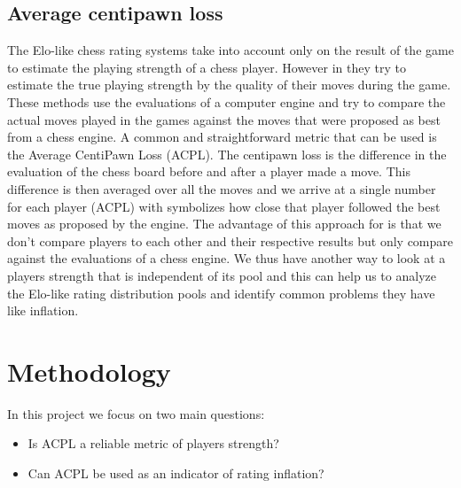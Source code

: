 \documentclass{article}
\begin{document}
\subsection{Average centipawn loss}
The Elo-like chess rating systems take into account only on the result of the game to estimate the playing strength of a chess player. However in \cite{icr,Alliot,Guid} they try to estimate the true playing strength by the quality of their moves during the game. These methods use the evaluations of a computer engine and try to compare the actual moves played in the games against the moves that were proposed as best from a chess engine. A common and straightforward metric that can be used is the Average CentiPawn Loss (ACPL). The centipawn loss is the difference in the evaluation of the chess board before and after a player made a move. This difference is then averaged over all the moves and we arrive at a single number for each player (ACPL) with symbolizes how close that player followed the best moves as proposed by the engine.
The advantage of this approach for is that we don’t compare players to each other and their respective results but only compare against the evaluations of a chess engine. We thus have another way to look at a players strength that is independent of its pool and this can help us to analyze the Elo-like rating distribution pools and identify common problems they have like inflation.


\section{Methodology}

In this project we focus on two main questions:

\begin{itemize}

\item Is ACPL a reliable metric of players strength?
\item Can ACPL be used as an indicator of rating inflation?

\end{itemize}
\end{document}
